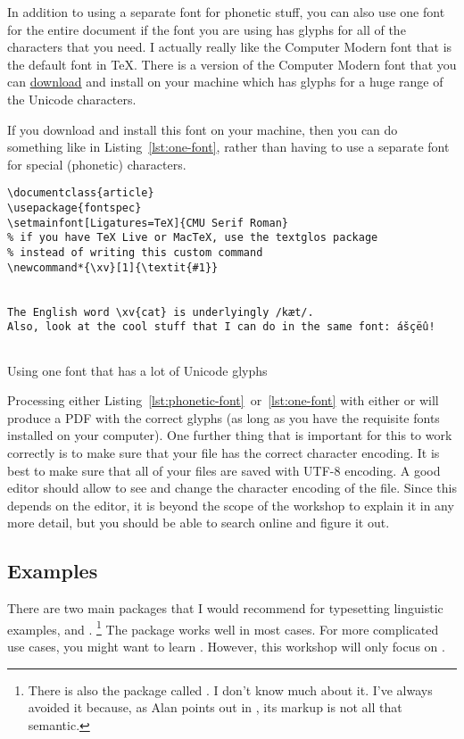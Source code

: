 In addition to using a separate font for phonetic stuff, you can also use one font for the entire document if the font you are using has glyphs for all of the characters that you need.
I actually really like the Computer Modern font that is the default font in \TeX.
There is a version of the Computer Modern font that you can \href{http://sourceforge.net/projects/cm-unicode/}{download} and install on your machine which has glyphs for a huge range of the Unicode characters.

If you download and install this font on your machine, then you can do something like in Listing~\ref{lst:one-font}, rather than having to use a separate font for special (phonetic) characters.

\begin{listing}[htbp]
	\centering
	\begin{verbatim}
\documentclass{article}
\usepackage{fontspec}
\setmainfont[Ligatures=TeX]{CMU Serif Roman}
% if you have TeX Live or MacTeX, use the textglos package
% instead of writing this custom command
\newcommand*{\xv}[1]{\textit{#1}}


The English word \xv{cat} is underlyingly /kæt/.
Also, look at the cool stuff that I can do in the same font: ášçëû!


	\end{verbatim}
	\caption{Using one font that has a lot of Unicode glyphs}
	\label{lst:one-font}
\end{listing}

Processing either Listing~\ref{lst:phonetic-font}~or~\ref{lst:one-font} with either  or  will produce a PDF with the correct glyphs (as long as you have the requisite fonts installed on your computer).
One further thing that is important for this to work correctly is to make sure that your  file has the correct character encoding.
It is best to make sure that all of your  files are saved with UTF-8 encoding.
A good editor should allow to see and change the character encoding of the file.
Since this depends on the editor, it is beyond the scope of the workshop to explain it in any more detail, but you should be able to search online and figure it out.

\subsection{Examples}
\label{subsec:examples}

There are two main packages that I would recommend for typesetting linguistic examples,  and .%
\footnote{%
There is also the package called .
I don't know much about it.
I've always avoided it because, as Alan points out in , its markup is not all that semantic.%
}
The  package works well in most cases.
For more complicated use cases, you might want to learn .
However, this workshop will only focus on .

